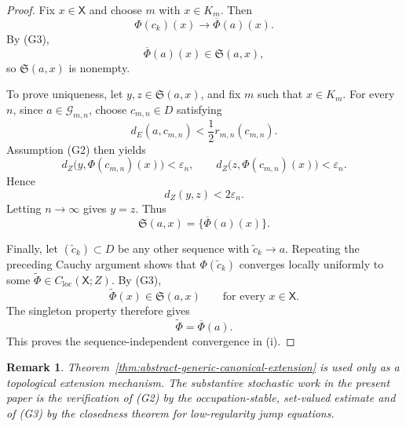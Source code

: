\documentclass[12pt,oneside, reqno]{amsart}
\newtheorem{remark}[theorem]{Remark}
\numberwithin{equation}{section}
\begin{document}
\begin{proof}
	Fix \(x\in\mathsf X\) and choose \(m\) with \(x\in K_m\). Then
	\[
	\Phi(c_k)(x)
	\longrightarrow
	\overline\Phi(a)(x).
	\]
	By \textnormal{(G3)},
	\[
	\overline\Phi(a)(x)\in\mathfrak S(a,x),
	\]
	so \(\mathfrak S(a,x)\) is nonempty.
	
	To prove uniqueness, let
	\(y,z\in\mathfrak S(a,x)\), and fix \(m\) such that \(x\in K_m\).
	For every \(n\), since \(a\in\mathcal G_{m,n}\), choose
	\(c_{m,n}\in D\) satisfying
	\[
	d_E(a,c_{m,n})
	<
	\frac12r_{m,n}(c_{m,n}).
	\]
	Assumption \textnormal{(G2)} then yields
	\[
	d_Z\bigl(y,\Phi(c_{m,n})(x)\bigr)
	<
	\varepsilon_n,
	\qquad
	d_Z\bigl(z,\Phi(c_{m,n})(x)\bigr)
	<
	\varepsilon_n.
	\]
	Hence
	\[
	d_Z(y,z)<2\varepsilon_n.
	\]
	Letting \(n\to\infty\) gives \(y=z\). Thus
	\[
	\mathfrak S(a,x)
	=
	\{\overline\Phi(a)(x)\}.
	\]
	
	Finally, let \((\widetilde c_k)\subset D\) be any other sequence with
	\(\widetilde c_k\to a\). Repeating the preceding Cauchy argument shows
	that \(\Phi(\widetilde c_k)\) converges locally uniformly to some
	\(\widetilde\Phi\in C_{\mathrm{loc}}(\mathsf X;Z)\). By
	\textnormal{(G3)},
	\[
	\widetilde\Phi(x)\in\mathfrak S(a,x)
	\qquad
	\text{for every }x\in\mathsf X.
	\]
	The singleton property therefore gives
	\[
	\widetilde\Phi=\overline\Phi(a).
	\]
	This proves the sequence-independent convergence in
	\textnormal{(i)}.
\end{proof}
	
	\begin{remark}
		\label{rem:abstract-extension-role}
		Theorem~\ref{thm:abstract-generic-canonical-extension} is used only as
		a topological extension mechanism. The substantive stochastic work in
		the present paper is the verification of \textnormal{(G2)} by the
		occupation-stable, set-valued estimate and of \textnormal{(G3)} by the
		closedness theorem for low-regularity jump equations.
	\end{remark}
	
\end{document}
